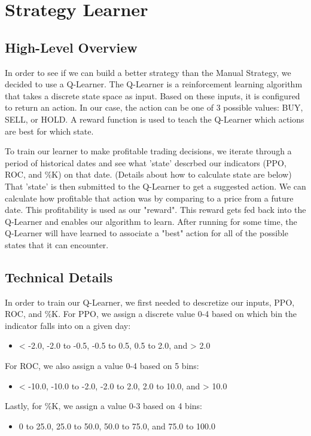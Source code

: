 \documentclass[
	letterpaper, %
]{jdf}
\begin{document}
\section{Strategy Learner}
\subsection{High-Level Overview}
In order to see if we can build a better strategy than the Manual Strategy, we decided to use a Q-Learner.
The Q-Learner is a reinforcement learning algorithm that takes a discrete state space as input.
Based on these inputs, it is configured to return an action. 
In our case, the action can be one of 3 possible values: BUY, SELL, or HOLD.
A reward function is used to teach the Q-Learner which actions are best for which state.

To train our learner to make profitable trading decisions, we iterate through a period of historical dates and see what 'state' descrbed our indicators (PPO, ROC, and \%K) on that date. 
(Details about how to calculate state are below)
That 'state' is then submitted to the Q-Learner to get a suggested action.
We can calculate how profitable that action was by comparing to a price from a future date.
This profitability is used as our "reward".
This reward gets fed back into the Q-Learner and enables our algorithm to learn.
After running for some time, the Q-Learner will have learned to associate a "best" action for all of the possible states that it can encounter.

\subsection{Technical Details}
In order to train our Q-Learner, we first needed to descretize our inputs, PPO, ROC, and \%K.
For PPO, we assign a discrete value 0-4 based on which bin the indicator falls into on a given day:
\begin{itemize}
	\item < -2.0, -2.0 to -0.5, -0.5 to 0.5, 0.5 to 2.0, and > 2.0
\end{itemize}

For ROC, we also assign a value 0-4 based on 5 bins:
\begin{itemize}
	\item < -10.0, -10.0 to -2.0, -2.0 to 2.0, 2.0 to 10.0, and > 10.0
\end{itemize}

Lastly, for \%K, we assign a value 0-3 based on 4 bins:
\begin{itemize}
	\item 0 to 25.0, 25.0 to 50.0, 50.0 to 75.0, and 75.0 to 100.0
\end{itemize}
\end{document}
